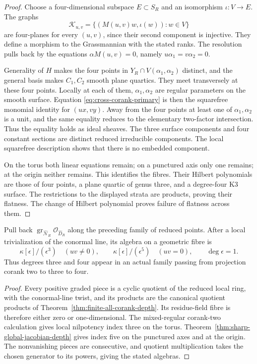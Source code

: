 \begin{proof}
Choose a four-dimensional subspace \(E\subset S_R\) and an
isomorphism \(\iota:V\to E\).  The graphs
\[
 \mathcal K_{u,v}=\{(M(u,v)w,\iota(w)):w\in V\}
\]
are four-planes for every \((u,v)\), since their second component
is injective.  They define a morphism to the Grassmannian with the
stated ranks.  The resolution pulls back by the equations
\(\alpha M(u,v)=0\), namely \(u\alpha_1=v\alpha_2=0\).

Generality of \(H\) makes the four points in
\(Y_R\cap V(\alpha_1,\alpha_2)\) distinct, and the general basis
makes \(C_1,C_2\) smooth plane quartics.  They meet transversely at
these four points.  Locally at each of them, \(\alpha_1,\alpha_2\)
are regular parameters on the smooth surface.  Equation
\eqref{eq:cross-corank-primary} is then the squarefree monomial
identity for \((ux,vy)\).  Away from the four points at least one
of \(\alpha_1,\alpha_2\) is a unit, and the same equality reduces
to the elementary two-factor intersection.  Thus the equality holds
as ideal sheaves.  The three surface components and four constant
sections are distinct reduced irreducible components.  The local
squarefree description shows that there is no embedded component.

On the torus both linear equations remain; on a punctured axis only
one remains; at the origin neither remains.  This identifies the
fibres.  Their Hilbert polynomials are those of four points, a plane
quartic of genus three, and a degree-four K3 surface.  The restrictions
to the displayed strata are products, proving their flatness.  The
change of Hilbert polynomial proves failure of flatness across them.
\end{proof}

\begin{proposition}
\label{prop:cross-corank-graded-fibres}
Pull back \(\operatorname{gr}_{\widehat{\mathcal N}_R}
\mathcal O_{\widehat D_R}\) along the preceding family of reduced
points.  After a local trivialization of the conormal line, its algebra
on a geometric fibre is
\[
 \kappa[\epsilon]/(\epsilon^3)\quad(uv\ne0),
 \qquad
 \kappa[\epsilon]/(\epsilon^5)\quad(uv=0),
 \qquad \deg\epsilon=1.
\]
Thus degrees three and four appear in an actual family passing from
projection corank two to three to four.
\end{proposition}
\begin{proof}
Every positive graded piece is a cyclic quotient of the reduced local
ring, with the conormal-line twist, and its products are the canonical
quotient products of Theorem~\ref{thm:finite-all-corank-depth}.
Its residue-field fibre is therefore either zero or one-dimensional.
The mixed-regular corank-two calculation gives local nilpotency index
three on the torus.  Theorem~\ref{thm:sharp-global-jacobian-depth}
gives index five on the punctured axes and at the origin.  The
nonvanishing pieces are consecutive, and quotient multiplication takes
the chosen generator to its powers, giving the stated algebras.
\end{proof}

